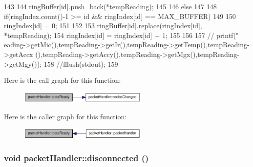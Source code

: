 \begin{DoxyCode}
{143       {
144         ringBuffer[id].push_back(*tempReading);
145       }
146       else
147       {
148         if(ringIndex.count()-1 >= id && ringIndex[id] == MAX_BUFFER)
149           {
150               ringIndex[id] = 0;
151           }
152 
153           ringBuffer[id].replace(ringIndex[id], *tempReading);
154           ringIndex[id] = ringIndex[id] + 1;
155       }
156 
157 //      printf("%
      eading->getMic(),tempReading->getIr(),tempReading->getTemp(),tempReading->getAccx
      (),tempReading->getAccy(),tempReading->getMgx(),tempReading->getMgy());
158       //fflush(stdout);
159 }
\end{DoxyCode}




Here is the call graph for this function:\nopagebreak
\begin{figure}[H]
\begin{center}
\leavevmode
\includegraphics[width=181pt]{classpacketHandler_a9085a61a51eccc7acb240a7b68601686_cgraph}
\end{center}
\end{figure}




Here is the caller graph for this function:\nopagebreak
\begin{figure}[H]
\begin{center}
\leavevmode
\includegraphics[width=180pt]{classpacketHandler_a9085a61a51eccc7acb240a7b68601686_icgraph}
\end{center}
\end{figure}


\hypertarget{classpacketHandler_a43223a8930a6af8c40c5889d8e4b9d4b}{
\subsubsection[{disconnected}]{\setlength{\rightskip}{0pt plus 5cm}void packetHandler::disconnected ()}}
\label{classpacketHandler_a43223a8930a6af8c40c5889d8e4b9d4b}


